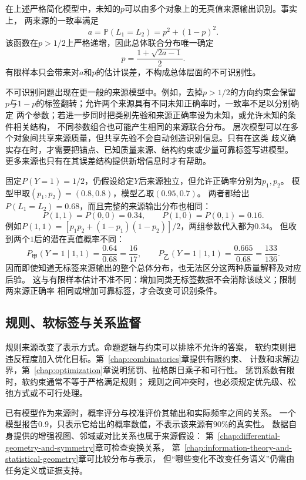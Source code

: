 在上述严格简化模型中，未知的\(p\)可以由多个对象上的无真值来源输出识别。事实上，
两来源的一致率满足
\[
  a
  =
  \mathbb{P}(L_1=L_2)
  =
  p^2+(1-p)^2.
\]
该函数在\(p>1/2\)上严格递增，因此总体联合分布唯一确定
\[
  p
  =
  \frac{1+\sqrt{2a-1}}{2}.
\]
有限样本只会带来对\(a\)和\(p\)的估计误差，不构成总体层面的不可识别性。

不可识别问题出现在更一般的来源模型中。例如，去掉\(p>1/2\)的方向约束会保留
\(p\)与\(1-p\)的标签翻转；允许两个来源具有不同未知正确率时，一致率不足以分别确定
两个参数；若进一步同时把类别先验和来源正确率设为未知，或允许未知的条件相关结构，
不同参数组合也可能产生相同的来源联合分布。
层次模型可以在多个对象间共享来源质量，但共享先验不会自动创造识别信息。只有在这类
歧义确实存在时，才需要把锚点、已知质量来源、结构约束或少量可靠标签写进模型。
更多来源也只有在其误差结构提供新增信息时才有帮助。

\begin{example}[相同来源输出与不同潜在解释]
  \label{ex:future-source-quality-nonidentifiability}
  固定$P(Y=1)=1/2$，仍假设给定$Y$后来源独立，但允许正确率分别为$p_1,p_2$。
  模型甲取$(p_1,p_2)=(0.8,0.8)$，模型乙取$(0.95,0.7)$。
  两者都给出$P(L_1=L_2)=0.68$，而且完整的来源输出分布也相同：
  \[
    P(1,1)=P(0,0)=0.34,\qquad
    P(1,0)=P(0,1)=0.16.
  \]
  例如$P(1,1)=[p_1p_2+(1-p_1)(1-p_2)]/2$，两组参数代入都为$0.34$。
  但收到两个$1$后的潜在真值概率不同：
  \[
    P_{\text{甲}}(Y=1\mid1,1)=\frac{0.64}{0.68}=\frac{16}{17},
    \qquad
    P_{\text{乙}}(Y=1\mid1,1)=\frac{0.665}{0.68}=\frac{133}{136}.
  \]
  因而即使知道无标签来源输出的整个总体分布，也无法区分这两种质量解释及对应后验。
  这与有限样本估计不准不同：增加同类无标签数据不会消除该歧义；限制两来源正确率
  相同或增加可靠标签，才会改变可识别条件。
\end{example}

\subsection{规则、软标签与关系监督}
\label{sec:future-rules-model-outputs-learning-objectives}

规则来源改变了表示方式。命题逻辑与约束可以排除不允许的答案，
软约束则把违反程度加入优化目标。第~\ref{chap:combinatorics}章提供有限约束、
计数和求解边界，第~\ref{chap:optimization}章说明惩罚、拉格朗日乘子和可行性。
惩罚系数有限时，软约束通常不等于严格满足规则；
规则之间冲突时，也必须规定优先级、松弛方式或不可行处理。

已有模型作为来源时，概率评分与校准评价其输出和实际频率之间的关系。
一个模型报告$0.9$，只表示它给出的概率数值，不表示该来源有$90\%$的真实性。
数据自身提供的增强视图、邻域或对比关系也属于来源假设：
第~\ref{chap:differential-geometry-and-symmetry}章可检查变换关系，
第~\ref{chap:information-theory-and-statistical-geometry}章可比较分布与表示，
但“哪些变化不改变任务语义”仍需由任务定义或证据支持。

